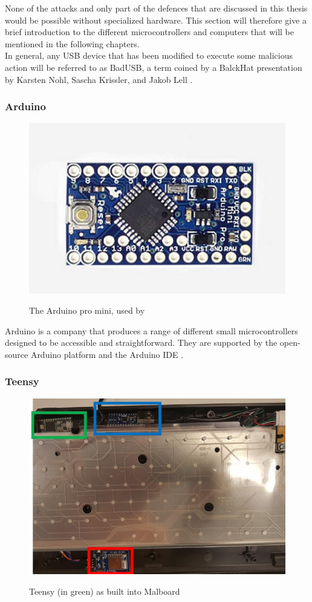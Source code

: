 None of the attacks and only part of the defences that are discussed in this thesis would be possible without specialized hardware. This section will therefore give a brief introduction to the different microcontrollers and computers that will be mentioned in the following chapters.\\
In general, any USB device that has been modified to execute some malicious action will be referred to as BadUSB, a term coined by a BalckHat presentation by Karsten Nohl, Sascha Krissler, and Jakob Lell \cite{Srlabsbadusbblackhatv1Pdf2014}. 


\subsubsection{Arduino}

\begin{figure}[H]
    \centering
    \includegraphics[width=0.25\linewidth]{visuals/arduinomini.png}
    \caption{The Arduino pro mini, used by \cite{bojovicRisingThreatHardware2019}}
    \label{fig:ArduinoProMini}
    \cite{ArduinoProMini}
\end{figure}
Arduino \cite{ArduinoHardware} is a company that produces a range of different small microcontrollers designed to be accessible and straightforward. They are supported by the open-source Arduino platform and the Arduino IDE \cite{ArduinoArduino2024}.


\subsubsection{Teensy}

\begin{figure}[H]
    \centering
    \includegraphics[width=0.5\linewidth]{visuals/teensy.png}
    \caption{Teensy (in green) as built into Malboard}
    \label{fig:builtInTeensy}
    \cite{farhiMalboardNovelUser2019}
\end{figure}

